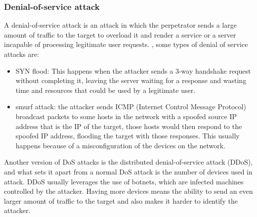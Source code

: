 \subsubsection{Denial-of-service attack}
A denial-of-service attack is an attack in which the perpetrator sends a large amount of traffic to the target to overload it and render a service or a server incapable of processing legitimate user requests. \cite{dos}, some types of denial of service attacks are:

	
\begin{itemize}
	\item SYN flood: This happens when the attacker sends a 3-way handshake request without completing it, leaving the server waiting for a response and wasting time and resources that could be used by a legitimate user. \cite{dos}
	\item smurf attack: the attacker sends ICMP (Internet Control Message Protocol) broadcast packets to some hosts in the network with a spoofed source IP address that is the IP of the target, those hosts would then respond to the spoofed IP address, flooding the target with those responses. This usually happens because of a misconfiguration of the devices on the network. \cite{dos}
\end{itemize}

Another version of DoS attacks is the distributed denial-of-service attack (DDoS), and what sets it apart from a normal DoS attack is the number of devices used in attack. DDoS usually leverages the use of botnets, which are infected machines controlled by the attacker. Having more devices means the ability to send an even larger amount of traffic to the target and also makes it harder to identify the attacker. \cite{dos}
	

